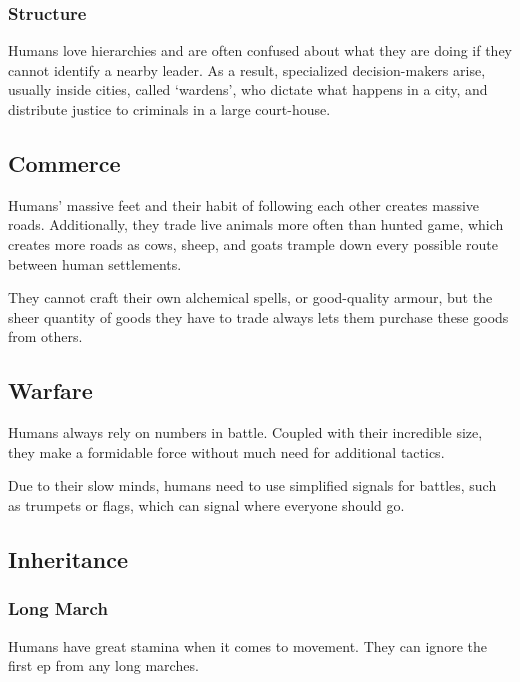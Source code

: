\begin{multicols}{2}
\subsubsection{Structure}

Humans love hierarchies and are often confused about what they are doing if they cannot identify a nearby leader.
As a result, specialized decision-makers arise, usually inside cities, called `\glspl{warden}', who dictate what happens in a city, and distribute justice to criminals in a large court-house.

\subsection{Commerce}

Humans' massive feet and their habit of following each other creates massive roads.
Additionally, they trade live animals more often than hunted game, which creates more roads as cows, sheep, and goats trample down every possible route between human settlements.

They cannot craft their own alchemical spells, or good-quality armour, but the sheer quantity of goods they have to trade always lets them purchase these goods from others.

\subsection{Warfare}
Humans always rely on numbers in battle.
Coupled with their incredible size, they make a formidable force without much need for additional tactics.

Due to their slow minds, humans need to use simplified signals for battles, such as trumpets or flags, which can signal where everyone should go.

\subsection{Inheritance}

\subsubsection[Long March: ignore first \glsentrytext{ep} from exercise]{Long March}
\label{humanInheritance}

Humans have great stamina when it comes to movement.
They can ignore the first \gls{ep} from any long marches.

\subsubsection{}


\end{multicols}
